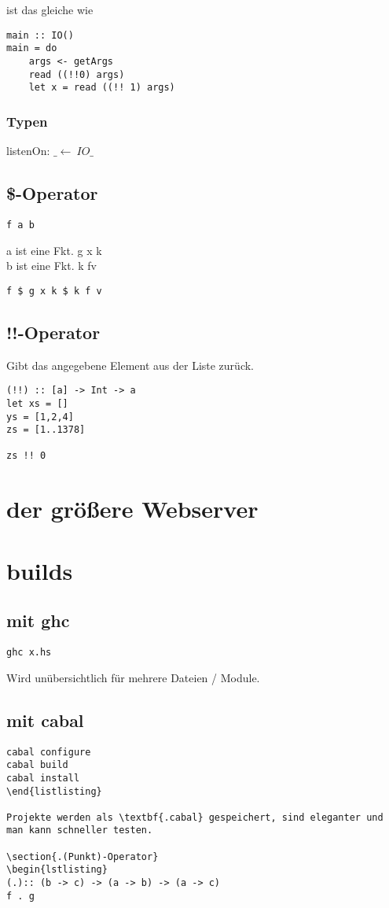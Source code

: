 \documentclass[ngerman]{report}
\begin{document}
ist das gleiche wie
\begin{lstlisting}
main :: IO()
main = do
	args <- getArgs
	read ((!!0) args)
	let x = read ((!! 1) args)
\end{lstlisting}

\subsubsection{Typen}

listenOn: $\_ \leftarrow \ IO\_$

\subsection{\$-Operator}
\begin{lstlisting}
f a b
\end{lstlisting}
a ist eine Fkt. g x k\\
b ist eine Fkt. k fv

\begin{lstlisting}
f $ g x k $ k f v
\end{lstlisting}

\subsection{!!-Operator}
Gibt das angegebene Element aus der Liste zurück.
\begin{lstlisting}
(!!) :: [a] -> Int -> a
let xs = []
ys = [1,2,4]
zs = [1..1378]

zs !! 0
\end{lstlisting}
\section{der größere Webserver}

\section{builds}
\subsection{mit ghc}
\begin{lstlisting}
ghc x.hs
\end{lstlisting}
Wird unübersichtlich für mehrere Dateien / Module.

\subsection{mit cabal}
\begin{lstlisting}
cabal configure
cabal build
cabal install
\end{listlisting}

Projekte werden als \textbf{.cabal} gespeichert, sind eleganter und man kann schneller testen.

\section{.(Punkt)-Operator}
\begin{lstlisting}
(.):: (b -> c) -> (a -> b) -> (a -> c)
f . g
\end{lstlisting}
\end{document}
